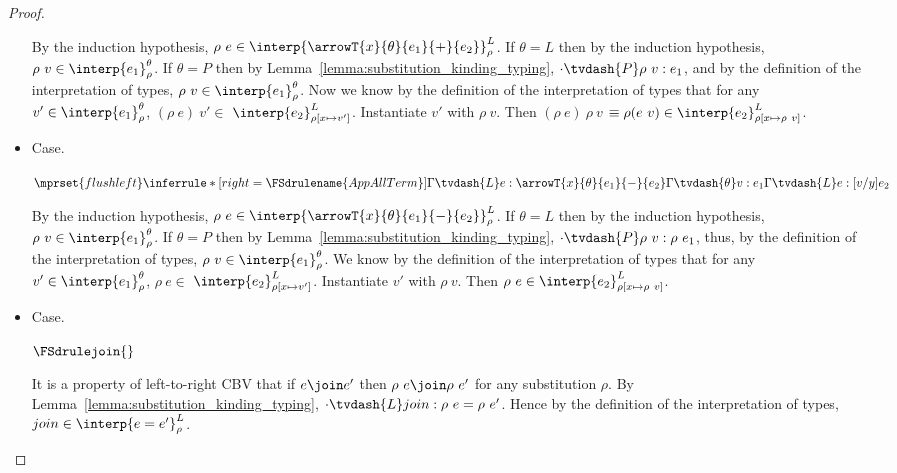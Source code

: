 \begin{proof}
\begin{itemize}
    By the induction hypothesis, $\rho\ e \in
    \interp{\arrowT{x}{\theta}{e_1}{+}{e_2}}^L_\rho$.  If $\theta = L$ then
    by the induction hypothesis, $\rho\ v \in \interp{e_1}^\theta_\rho$.  If $\theta = P$ then
    by Lemma~\ref{lemma:substitution_kinding_typing}, $\cdot \tvdash{P} \rho\ v:e_1$, and by the
    definition of the interpretation of types, $\rho\ v \in \interp{e_1}^\theta_\rho$.
    Now we know by the 
    definition of the
    interpretation of types that for any $v' \in
    \interp{e_1}^\theta_\rho$, $(\rho\ e)\ v' \in $
    $\interp{e_2}^L_{\rho[x \mapsto v']}$.  Instantiate $v'$ with $\rho\ v$. 
    Then $(\rho\ e)\ \rho\ v$ $\equiv \rho(e\ v) \in
    \interp{e_2}^L_{\rho[x \mapsto \rho\ v]}$.
    
  \item[]Case.\ \\
    \begin{center}
      \begin{math}
        $$\mprset{flushleft}
        \inferrule*[right=\FSdrulename{AppAllTerm}]{
          \Gamma \tvdash{L} e:\arrowT{x}{\theta}{e_1}{-}{e_2}
          \\\\
          \Gamma \tvdash{\theta} v:e_1
        }{\Gamma \tvdash{L} e:[v/y]e_2}
      \end{math}
    \end{center}

    By the induction hypothesis, $\rho\ e \in
    \interp{\arrowT{x}{\theta}{e_1}{-}{e_2}}^L_\rho$.  If $\theta = L$ then
    by the induction hypothesis, $\rho\ v \in \interp{e_1}^\theta_\rho$.  If
    $\theta = P$ then by Lemma~\ref{lemma:substitution_kinding_typing},
    $\cdot \tvdash{P} \rho\ v:\rho\ e_1$, thus, by the definition of the interpretation
    of types, $\rho\ v \in \interp{e_1}^\theta_\rho$.
    We know by the definition of the
    interpretation of types that for any $v' \in
    \interp{e_1}^\theta_\rho$, $\rho\ e \in $
    $\interp{e_2}^L_{\rho[x \mapsto v']}$.  Instantiate $v'$ with $\rho\ v$. 
    Then $\rho\ e \in \interp{e_2}^L_{\rho[x \mapsto \rho\ v]}$.
  
  \item[]Case.\ \\
    \begin{center}
      $\FSdrulejoin{}$
    \end{center}  
    It is a property of left-to-right CBV that
    if $e \join e'$ then $\rho\ e \join \rho\ e'$ for any substitution $\rho$.
    By Lemma~\ref{lemma:substitution_kinding_typing}, 
    $\cdot \tvdash{L} join : \rho\ e = \rho\ e'$.
    Hence by the definition of the interpretation of types, $join \in \interp{e = e'}^L_\rho$.


\end{itemize}
\end{proof}

